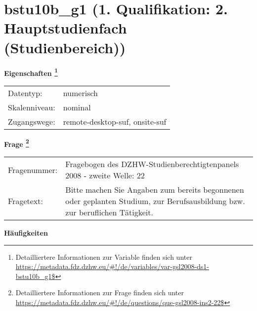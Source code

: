 
    \setcounter{footnote}{0}

    \vspace*{-1.8cm}
	\section{bstu10b\_g1 (1. Qualifikation: 2. Hauptstudienfach (Studienbereich))}
	\label{section:bstu10b_g1}



    \vspace*{0.5cm}
    \noindent\textbf{Eigenschaften
	\footnote{Detailliertere Informationen zur Variable finden sich unter
		\url{https://metadata.fdz.dzhw.eu/\#!/de/variables/var-gsl2008-ds1-bstu10b_g1$}}}\\
	\begin{tabularx}{\hsize}{@{}lX}
	Datentyp: & numerisch \\
	Skalenniveau: & nominal \\
	Zugangswege: &
	  remote-desktop-suf, 
	  onsite-suf
 \\
    \end{tabularx}



				\vspace*{0.5cm}
                \noindent\textbf{Frage
	                \footnote{Detailliertere Informationen zur Frage finden sich unter
		              \url{https://metadata.fdz.dzhw.eu/\#!/de/questions/que-gsl2008-ins2-22$}}}\\
				\begin{tabularx}{\hsize}{@{}lX}
					Fragenummer: &
					  Fragebogen des DZHW-Studienberechtigtenpanels 2008 - zweite Welle:
					  22
 \\
					Fragetext: & Bitte machen Sie Angaben zum bereits begonnenen oder geplanten Studium, zur Berufsausbildung bzw. zur beruflichen Tätigkeit. \\
				\end{tabularx}





        		\vspace*{0.5cm}
                \noindent\textbf{Häufigkeiten}

